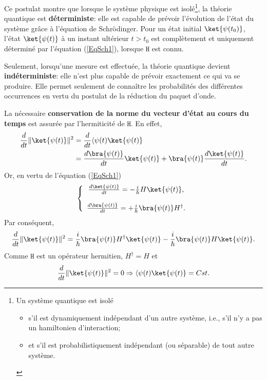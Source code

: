 Ce postulat montre que lorsque le système physique est isolé\footnote{Un système
quantique est isolé
\begin{itemize}
\item s'il est dynamiquement indépendant d'un autre système, i.e., s'il n'y a
pas un hamiltonien d'interaction;
\item et s'il est probabilistiquement indépendant (ou séparable) de tout autre
système.
\end{itemize}
}, la théorie quantique est \textbf{déterministe}: elle est capable de prévoir
l'évolution de l'état du système grâce à l'équation de Schrödinger. Pour un état
initial $\ket{\psi(t_0)}$, l'état $\ket{\psi(t)}$ à un instant ultérieur
$t>t_0$ est complètement et uniquement déterminé par l'équation
(\ref{EqSch1}), lorsque $\mathtt{H}$ est connu.

Seulement, lorsqu'une mesure est effectuée, la théorie quantique devient
\textbf{indéterministe}: elle n'est plus capable de prévoir exactement ce qui
va se produire. Elle permet seulement de connaître les probabilités des
différentes occurrences en vertu du postulat de la réduction du paquet d'onde.

La nécessaire \textbf{conservation de la norme du vecteur d'état au cours du
temps} est assurée par l'hermiticité de $\mathtt{H}$. En effet,
\begin{subequations}%
\begin{align}
\frac{d}{dt}\|\ket{\psi(t)}\|^{2}  & =\frac{d}{dt}\langle\psi(t)\ket{\psi(t)}\\
&  =\frac{d\bra{\psi(t)}}{dt}\ket{\psi(t)}+\bra{\psi(t)}
\frac{d\ket{\psi(t)}}{dt}.
\end{align}
\end{subequations}%
Or, en vertu de l'équation (\ref{EqSch1})
\begin{equation}
\left\{
\begin{array}
[c]{c}%
\frac{d\ket{\psi(t)}}{dt}=-\frac{i}{\hbar}H\ket{\psi(t)},\\
\\
\frac{d\bra{\psi(t)}}{dt}=+\frac{i}{\hbar}\bra{\psi(t)}H^{\dag}.
\end{array}
\right.
\label{EqSch2}%
\end{equation}
Par conséquent,%
\begin{equation}
\frac{d}{dt}\|\ket{\psi(t)}\|^{2}=\frac{i}{\hbar}\bra{\psi(t)}H^{\dag}
\ket{\psi(t)}-\frac{i}{\hbar}\bra{\psi(t)}H\ket{\psi(t)}.
\end{equation}
Comme $\mathtt{H}$ est un opérateur hermitien, $H^{\dag}=H$ et
\begin{equation}
\frac{d}{dt}\|\ket{\psi(t)}\|^{2}=0\Rightarrow\langle\psi(t)\ket{\psi(t)}=Cst.
\label{eq:ConsNormV}
\end{equation}

